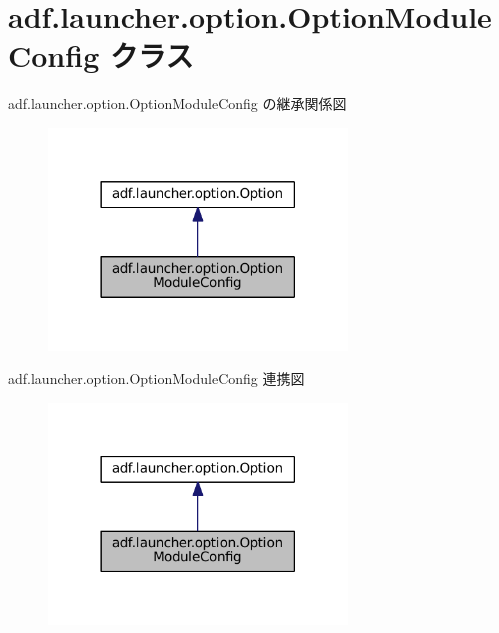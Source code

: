 \hypertarget{classadf_1_1launcher_1_1option_1_1OptionModuleConfig}{}\section{adf.\+launcher.\+option.\+Option\+Module\+Config クラス}
\label{classadf_1_1launcher_1_1option_1_1OptionModuleConfig}


adf.\+launcher.\+option.\+Option\+Module\+Config の継承関係図
\nopagebreak
\begin{figure}[H]
\begin{center}
\leavevmode
\includegraphics[width=225pt]{classadf_1_1launcher_1_1option_1_1OptionModuleConfig__inherit__graph}
\end{center}
\end{figure}


adf.\+launcher.\+option.\+Option\+Module\+Config 連携図
\nopagebreak
\begin{figure}[H]
\begin{center}
\leavevmode
\includegraphics[width=225pt]{classadf_1_1launcher_1_1option_1_1OptionModuleConfig__coll__graph}
\end{center}
\end{figure}
